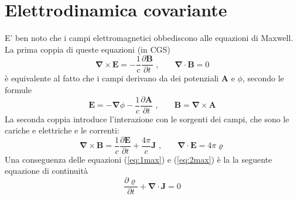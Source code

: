 \documentclass[a4paper,11pt]{book}
\theoremstyle{plain}
\theoremstyle{definition}
\begin{document}
\chapter{Elettrodinamica covariante}
E' ben noto che i campi elettromagnetici obbediscono alle equazioni di Maxwell. La prima coppia di queste equazioni (in CGS)
\begin{equation}\label{eq:1max}
\boldsymbol{\nabla}\times \textbf{E} = -\frac{1}{c}\frac{\partial \textbf{B}}{\partial t} \text{ ,}\qquad \boldsymbol{\nabla}\cdot \textbf{B} = 0
\end{equation}
è equivalente al fatto che i campi derivano da dei potenziali $\textbf{A}$ e $\phi$, secondo le formule
\begin{equation}\label{eq:potenziali}
\textbf{E}=-\boldsymbol{\nabla}\phi-\frac{1}{c}\frac{\partial \textbf{A}}{\partial t} \text{ ,} \qquad \textbf{B}=\boldsymbol{\nabla}\times \textbf{A}
\end{equation}
La seconda coppia introduce l'interazione con le sorgenti dei campi, che sono le cariche e elettriche e le correnti:
\begin{equation}\label{eq:2max}
\boldsymbol{\nabla}\times \textbf{B} = \frac{1}{c}\frac{\partial \textbf{E}}{\partial t}+\frac{4\pi}{c}\textbf{J} \text{ ,} \qquad \boldsymbol{\nabla}\cdot \textbf{E}=4\pi\varrho
\end{equation}
Una conseguenza delle equazioni (\ref{eq:1max}) e (\ref{eq:2max}) è la la seguente equazione di continuità
\begin{equation}\label{eq:cons}
\frac{\partial \varrho}{\partial t}+\boldsymbol{\nabla}\cdot \textbf{J} = 0
\end{equation}
\end{document}
